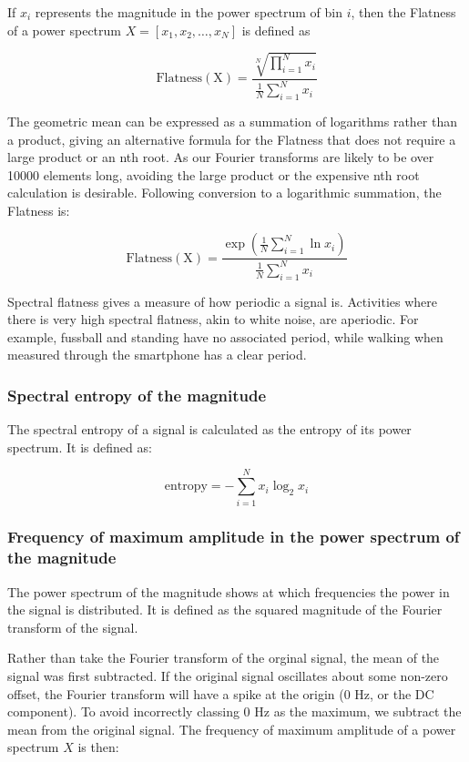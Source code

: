         If $x_i$ represents the magnitude in the power spectrum of bin $i$, then the Flatness of a power spectrum $X = [x_1, x_2, \dots , x_N]$ is defined as
        
        $$\mathrm{Flatness(X)} = \frac{\sqrt[N]{\prod\limits_{i=1}^N x_i}}{\frac{1}{N}\sum_{i=1}^N x_i}$$
        
        The geometric mean can be expressed as a summation of logarithms rather than a product, giving an alternative formula for the Flatness that does not require a large product or an nth root. As our Fourier transforms are likely to be over 10000 elements long, avoiding the large product or the expensive nth root calculation is desirable. Following conversion to a logarithmic summation, the Flatness is:
        
        $$\mathrm{Flatness(X)} = \frac{\exp \left( \frac{1}{N}\sum\limits_{i=1}^N \ln x_i \right) }{\frac{1}{N}\sum_{i=1}^N x_i}$$
        
        Spectral flatness gives a measure of how periodic a signal is. Activities where there is very high spectral flatness, akin to white noise, are aperiodic. For example, fussball and standing have no associated period, while walking when measured through the smartphone has a clear period.
      \subsubsection{Spectral entropy of the magnitude}
        The spectral entropy of a signal is calculated as the entropy of its power spectrum. It is defined as:

        $$\mathrm{entropy} = -\sum\limits_{i=1}^N x_i \log_2 x_i$$
      \subsubsection{Frequency of maximum amplitude in the power spectrum of the magnitude}
        The power spectrum of the magnitude shows at which frequencies the power in the signal is distributed. It is defined as the squared magnitude of the Fourier transform of the signal.
        
        Rather than take the Fourier transform of the orginal signal, the mean of the signal was first subtracted. If the original signal oscillates about some non-zero offset, the Fourier transform will have a spike at the origin (0 \si{Hz}, or the DC component). To avoid incorrectly classing 0 \si{Hz} as the maximum, we subtract the mean from the original signal. The frequency of maximum amplitude of a power spectrum $X$ is then:
        
